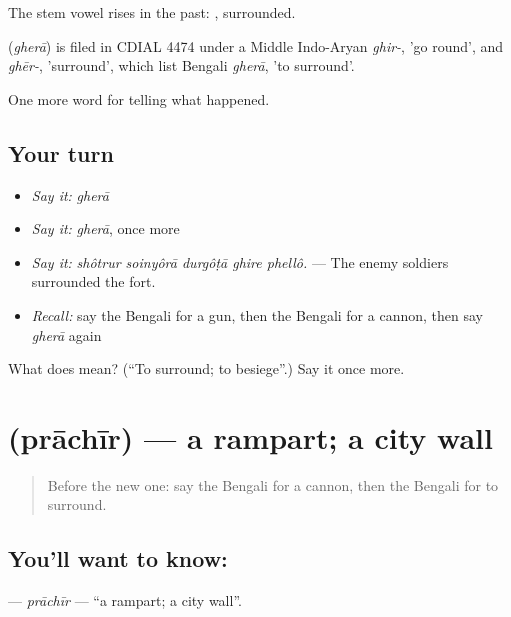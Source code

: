 The stem vowel rises in the past: , surrounded.

\begin{cousinweb}
\textbf{} (\emph{gherā}) is filed in CDIAL 4474 under a Middle Indo-Aryan \emph{ghir-}, 'go round', and \emph{ghēr-}, 'surround', which list Bengali \emph{gherā}, 'to surround'.
\end{cousinweb}

\begin{grammarlens}[title={What you've built}]
One more word for telling what happened.
\end{grammarlens}

\subsection*{Your turn}
\begin{itemize}
\raggedright
  \item \emph{Say it:} \emph{gherā}
  \item \emph{Say it:} \emph{gherā}, once more
  \item \emph{Say it:} \emph{shôtrur soinyôrā durgôṭā ghire phellô.} — The enemy soldiers surrounded the fort.
  \item \emph{Recall:} say the Bengali for a gun, then the Bengali for a cannon, then say \emph{gherā} again
\end{itemize}

\begin{tcolorbox}[breakable,colback=teal!4,colframe=teal!35!black,title={Before you move on}]
What does  mean? (\textquotedblleft{}To surround; to besiege\textquotedblright{}.) Say it once more.
\end{tcolorbox}
\section[\texorpdfstring{\bn{প্রাচীর} (prāchīr)}{প্রাচীর (prāchīr)}]{ (prāchīr) — a rampart; a city wall}

\label{lesson:BN-C316-prachir}



\begin{quote}
Before the new one: say the Bengali for a cannon, then the Bengali for to surround.
\end{quote}

\subsection*{You'll want to know: }
\textbf{} — \emph{prāchīr} — \textquotedblleft{}a rampart; a city wall\textquotedblright{}.

